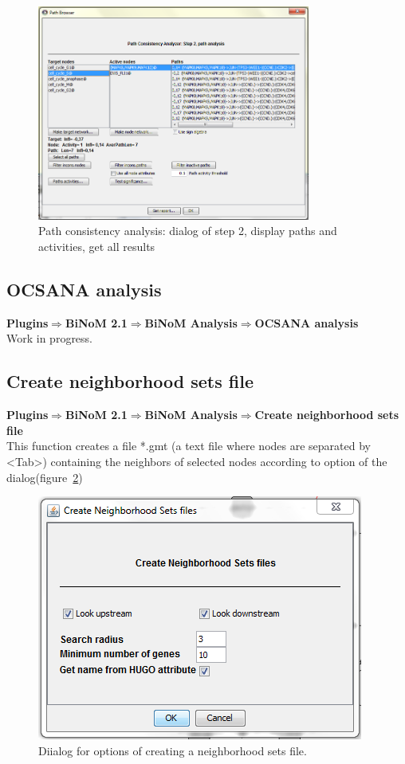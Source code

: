 \begin{figure}
\centering
\includegraphics[width=0.8\textwidth]{graphics/Path_consistency_analyser_Dialog2}
\caption{Path consistency analysis: dialog of step 2, display paths and activities, get all results}
\label{Path_consistency_analyser_Dialog2}
\end{figure}  

\subsection{OCSANA analysis}
\textbf{Plugins$\Rightarrow$BiNoM 2.1$\Rightarrow$BiNoM Analysis$\Rightarrow$OCSANA analysis}\\

Work in progress.

\subsection{Create neighborhood sets file}
\textbf{Plugins$\Rightarrow$BiNoM 2.1$\Rightarrow$BiNoM Analysis$\Rightarrow$Create neighborhood sets file}\\
This function creates a file *.gmt (a text file where nodes are separated by \textless Tab\textgreater) containing the neighbors of selected nodes according to option of the dialog(figure~\ref{Create_Neigborhood_File_Dialog})
\begin{figure}
\centering
\includegraphics[width=7 cm]{graphics/Create_Neigborhood_File_Dialog}
\caption{Diialog for options of creating a neighborhood sets file.}
\label{Create_Neigborhood_File_Dialog}
\end{figure}  
